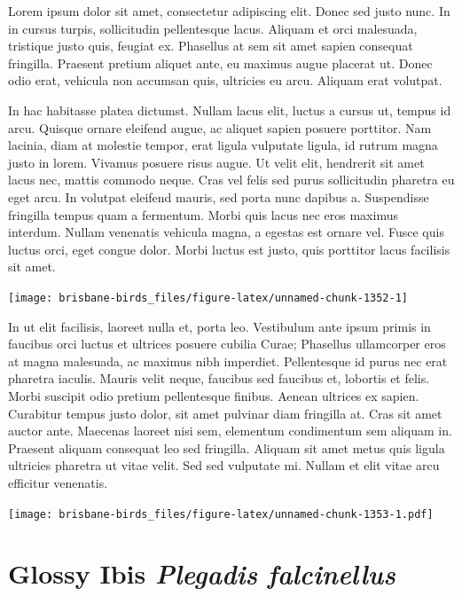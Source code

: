 \documentclass[]{book}
\let\origfigure\figure
\let\endorigfigure\endfigure
\renewenvironment{figure}[1][2] {
  \expandafter\origfigure\expandafter[H]
} {
  \endorigfigure
}
\begin{document}
Lorem ipsum dolor sit amet, consectetur adipiscing elit. Donec sed justo
nunc. In in cursus turpis, sollicitudin pellentesque lacus. Aliquam et
orci malesuada, tristique justo quis, feugiat ex. Phasellus at sem sit
amet sapien consequat fringilla. Praesent pretium aliquet ante, eu
maximus augue placerat ut. Donec odio erat, vehicula non accumsan quis,
ultricies eu arcu. Aliquam erat volutpat.

In hac habitasse platea dictumst. Nullam lacus elit, luctus a cursus ut,
tempus id arcu. Quisque ornare eleifend augue, ac aliquet sapien posuere
porttitor. Nam lacinia, diam at molestie tempor, erat ligula vulputate
ligula, id rutrum magna justo in lorem. Vivamus posuere risus augue. Ut
velit elit, hendrerit sit amet lacus nec, mattis commodo neque. Cras vel
felis sed purus sollicitudin pharetra eu eget arcu. In volutpat eleifend
mauris, sed porta nunc dapibus a. Suspendisse fringilla tempus quam a
fermentum. Morbi quis lacus nec eros maximus interdum. Nullam venenatis
vehicula magna, a egestas est ornare vel. Fusce quis luctus orci, eget
congue dolor. Morbi luctus est justo, quis porttitor lacus facilisis sit
amet.

\begin{figure}
\texttt{[image: brisbane-birds\_files/figure-latex/unnamed-chunk-1352-1]} \caption{insert figure caption}\label{fig:unnamed-chunk-1352}
\end{figure}

In ut elit facilisis, laoreet nulla et, porta leo. Vestibulum ante ipsum
primis in faucibus orci luctus et ultrices posuere cubilia Curae;
Phasellus ullamcorper eros at magna malesuada, ac maximus nibh
imperdiet. Pellentesque id purus nec erat pharetra iaculis. Mauris velit
neque, faucibus sed faucibus et, lobortis et felis. Morbi suscipit odio
pretium pellentesque finibus. Aenean ultrices ex sapien. Curabitur
tempus justo dolor, sit amet pulvinar diam fringilla at. Cras sit amet
auctor ante. Maecenas laoreet nisi sem, elementum condimentum sem
aliquam in. Praesent aliquam consequat leo sed fringilla. Aliquam sit
amet metus quis ligula ultricies pharetra ut vitae velit. Sed sed
vulputate mi. Nullam et elit vitae arcu efficitur venenatis.

\begin{figure}
\centering
\texttt{[image: brisbane-birds\_files/figure-latex/unnamed-chunk-1353-1.pdf]}
\caption{\label{fig:unnamed-chunk-1353}insert figure caption}
\end{figure}

\section{\texorpdfstring{Glossy Ibis \emph{Plegadis
falcinellus}}{Glossy Ibis Plegadis falcinellus}}\label{glossy-ibis-plegadis-falcinellus}
\end{document}
